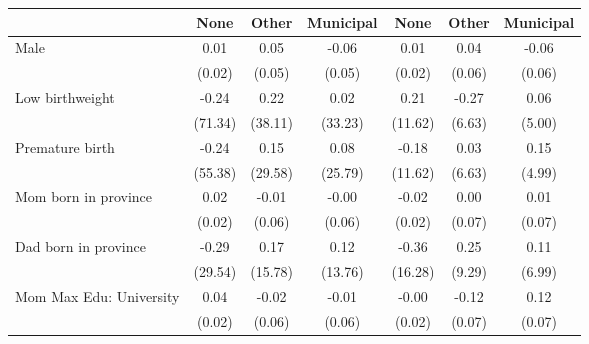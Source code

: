 {
\def\sym#1{\ifmmode^{#1}\else\(^{#1}\)\fi}
\begin{tabular}{l*{6}{c}}
\toprule
                    &\multicolumn{1}{c}{None}&\multicolumn{1}{c}{Other}&\multicolumn{1}{c}{Municipal}&\multicolumn{1}{c}{None}&\multicolumn{1}{c}{Other}&\multicolumn{1}{c}{Municipal}\\
\midrule
Male                &        0.01         &        0.05         &       -0.06         &        0.01         &        0.04         &       -0.06         \\
                    &      (0.02)         &      (0.05)         &      (0.05)         &      (0.02)         &      (0.06)         &      (0.06)         \\
\addlinespace
Low birthweight     &       -0.24         &        0.22         &        0.02         &        0.21         &       -0.27         &        0.06         \\
                    &     (71.34)         &     (38.11)         &     (33.23)         &     (11.62)         &      (6.63)         &      (5.00)         \\
\addlinespace
Premature birth     &       -0.24         &        0.15         &        0.08         &       -0.18         &        0.03         &        0.15         \\
                    &     (55.38)         &     (29.58)         &     (25.79)         &     (11.62)         &      (6.63)         &      (4.99)         \\
\addlinespace
Mom born in province&        0.02         &       -0.01         &       -0.00         &       -0.02         &        0.00         &        0.01         \\
                    &      (0.02)         &      (0.06)         &      (0.06)         &      (0.02)         &      (0.07)         &      (0.07)         \\
\addlinespace
Dad born in province&       -0.29         &        0.17         &        0.12         &       -0.36         &        0.25         &        0.11         \\
                    &     (29.54)         &     (15.78)         &     (13.76)         &     (16.28)         &      (9.29)         &      (6.99)         \\
\addlinespace
Mom Max Edu: University&        0.04         &       -0.02         &       -0.01         &       -0.00         &       -0.12         &        0.12         \\
                    &      (0.02)         &      (0.06)         &      (0.06)         &      (0.02)         &      (0.07)         &      (0.07)         \\

\end{tabular}}
